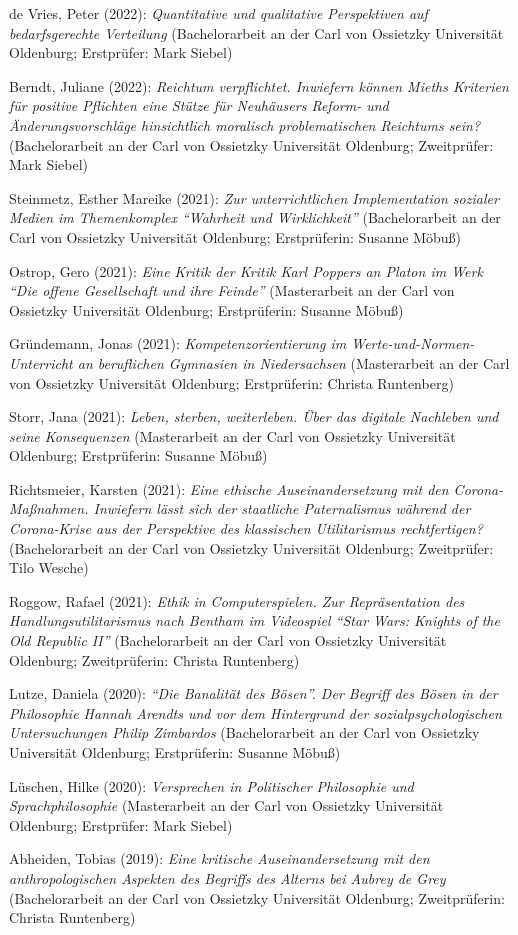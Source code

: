 \documentclass[a4paper,10pt]{article}
\newenvironment{literature}{%
   \parskip6pt\parindent0pt\raggedright
   \def\lititem{\hangindent=1cm\hangafter1}}{%
   \par\ignorespaces}
\begin{document}
\begin{literature}
\lititem de Vries, Peter (2022): \textit{Quantitative und qualitative Perspektiven auf bedarfsgerechte Verteilung} (Bachelorarbeit an der Carl von Ossietzky Universität Oldenburg; Erstprüfer: Mark Siebel)

\lititem Berndt, Juliane (2022): \textit{Reichtum verpflichtet. Inwiefern können Mieths Kriterien für positive Pflichten eine Stütze für Neuhäusers Reform- und Änderungsvorschläge hinsichtlich moralisch problematischen Reichtums sein?} (Bachelorarbeit an der Carl von Ossietzky Universität Oldenburg; Zweitprüfer: Mark Siebel)

\lititem Steinmetz, Esther Mareike (2021): \textit{Zur unterrichtlichen Implementation sozialer Medien im Themenkomplex \enquote{Wahrheit und Wirklichkeit}} (Bachelorarbeit an der Carl von Ossietzky Universität Oldenburg; Erstprüferin: Susanne Möbuß)

\lititem Ostrop, Gero (2021): \textit{Eine Kritik der Kritik Karl Poppers an Platon im Werk \enquote{Die offene Gesellschaft und ihre Feinde}} (Masterarbeit an der Carl von Ossietzky Universität Oldenburg; Erstprüferin: Susanne Möbuß)

\lititem Gründemann, Jonas (2021): \textit{Kompetenzorientierung im Werte-und-Normen-Unterricht an beruflichen Gymnasien in Niedersachsen} (Masterarbeit an der Carl von Ossietzky Universität Oldenburg; Erstprüferin: Christa Runtenberg)

\lititem Storr, Jana (2021): \textit{Leben, sterben, weiterleben. Über das digitale Nachleben und seine Konsequenzen} (Masterarbeit an der Carl von Ossietzky Universität Oldenburg; Erstprüferin: Susanne Möbuß)

\lititem Richtsmeier, Karsten (2021): \textit{Eine ethische Auseinandersetzung mit den Corona-Maßnahmen. Inwiefern lässt sich der staatliche Paternalismus während der Corona-Krise aus der Perspektive des klassischen Utilitarismus rechtfertigen?} (Bachelorarbeit an der Carl von Ossietzky Universität Oldenburg; Zweitprüfer: Tilo Wesche)

\lititem Roggow, Rafael (2021): \textit{Ethik in Computerspielen. Zur Repräsentation des Handlungsutilitarismus nach Bentham im Videospiel \enquote{Star Wars: Knights of the Old Republic II}} (Bachelorarbeit an der Carl von Ossietzky Universität Oldenburg; Zweitprüferin: Christa Runtenberg)

\lititem Lutze, Daniela (2020): \textit{\enquote{Die Banalität des Bösen}. Der Begriff des Bösen in der Philosophie Hannah Arendts und vor dem Hintergrund der sozialpsychologischen Untersuchungen Philip Zimbardos} (Bachelorarbeit an der Carl von Ossietzky Universität Oldenburg; Erstprüferin: Susanne Möbuß)

\lititem Lüschen, Hilke (2020): \textit{Versprechen in Politischer Philosophie und Sprachphilosophie} (Masterarbeit an der Carl von Ossietzky Universität Oldenburg; Erstprüfer: Mark Siebel)

\lititem Abheiden, Tobias (2019): \textit{Eine kritische Auseinandersetzung mit den anthropologischen Aspekten des Begriffs des Alterns bei Aubrey de Grey} (Bachelorarbeit an der Carl von Ossietzky Universität Oldenburg; Zweitprüferin: Christa Runtenberg)
\end{literature}
\end{document}
